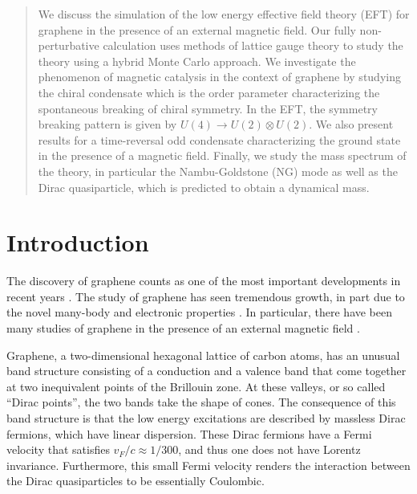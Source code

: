 \documentclass[aps,prd,twocolumn,showpacs,superscriptaddress,groupedaddress]{revtex4}  %
\begin{document}
\begin{abstract}
We discuss the simulation of the low energy effective field theory (EFT) for graphene in the presence of an external magnetic field. Our fully non-perturbative calculation 
uses methods of lattice gauge theory to study the theory using a hybrid Monte Carlo approach. We investigate the phenomenon of magnetic catalysis in the context of graphene by studying
the chiral condensate which is the order parameter characterizing the spontaneous breaking of chiral symmetry. In the EFT, the symmetry breaking pattern is given by $U(4) \to U(2) \otimes U(2)$. We also present results for a time-reversal odd condensate characterizing the ground state in the presence of a magnetic field.
Finally, we study the mass spectrum of the theory, in particular the Nambu-Goldstone (NG) mode as well as the Dirac quasiparticle, which is predicted to obtain a dynamical mass. 
\end{abstract}

\maketitle

\section{\label{sec:Intro}Introduction}
The discovery of graphene counts as one of the most important developments in recent years \cite{Novoselov}. The study of graphene has seen tremendous growth,
in part due to the novel many-body and electronic properties \cite{CastroNeto}. In particular, there have been many studies of graphene
in the presence of an external magnetic field \cite{Goerbig}.

Graphene, a two-dimensional hexagonal lattice of carbon atoms, has an unusual band structure consisting of a conduction and a valence band that come together at two inequivalent points 
of the Brillouin zone. At these valleys, or so called ``Dirac points'', the two bands take the shape of cones. The consequence of this band structure is that the low energy excitations are described by massless Dirac fermions, which have linear dispersion.
These Dirac fermions have a Fermi velocity that satisfies $v_F/c \approx 1/300$, and thus one does not have Lorentz invariance. Furthermore, this small Fermi velocity renders the interaction between the Dirac quasiparticles 
to be essentially Coulombic.
\end{document}
